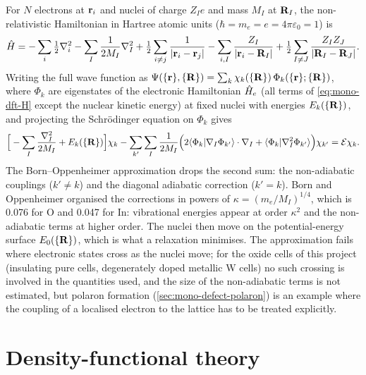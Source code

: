 For $N$ electrons at $\mathbf{r}_i$ and nuclei of charge $Z_I e$ and mass $M_I$ at $\mathbf{R}_I$, the non-relativistic Hamiltonian
in Hartree atomic units ($\hbar = m_e = e = 4\pi\varepsilon_0 = 1$) is
\begin{equation}
\hat{H} = -\sum_i \tfrac12\nabla_i^2 - \sum_I \frac{1}{2M_I}\nabla_I^2
 + \tfrac12\sum_{i\neq j}\frac{1}{|\mathbf{r}_i-\mathbf{r}_j|} - \sum_{i,I}\frac{Z_I}{|\mathbf{r}_i-\mathbf{R}_I|}
 + \tfrac12\sum_{I\neq J}\frac{Z_IZ_J}{|\mathbf{R}_I-\mathbf{R}_J|} .
\label{eq:mono-dft-H}
\end{equation}
Writing the full wave function as $\Psi(\{\mathbf{r}\},\{\mathbf{R}\}) = \sum_k \chi_k(\{\mathbf{R}\})\,\Phi_k(\{\mathbf{r}\};\{\mathbf{R}\})$, where
$\Phi_k$ are eigenstates of the electronic Hamiltonian $\hat{H}_e$ (all terms of \cref{eq:mono-dft-H} except the nuclear
kinetic energy) at fixed nuclei with energies $E_k(\{\mathbf{R}\})$, and projecting the Schr\"odinger equation on $\Phi_k$
gives
\begin{equation}
\Big[-\sum_I\frac{\nabla_I^2}{2M_I} + E_k(\{\mathbf{R}\})\Big]\chi_k
 - \sum_{k'}\sum_I \frac{1}{2M_I}\Big(2\langle\Phi_k|\nabla_I\Phi_{k'}\rangle\cdot\nabla_I
 + \langle\Phi_k|\nabla_I^2\Phi_{k'}\rangle\Big)\chi_{k'} = \mathcal{E}\chi_k .
\label{eq:mono-dft-bo-coupled}
\end{equation}
The Born--Oppenheimer approximation \citep{Born1927} drops the second sum: the non-adiabatic couplings ($k'\ne k$) and
the diagonal adiabatic correction ($k' = k$). Born and
Oppenheimer organised the corrections in powers of $\kappa = (m_e/M_I)^{1/4}$, which is 0.076 for O and 0.047 for In:
vibrational energies appear at order $\kappa^2$ and the non-adiabatic terms at higher order. The nuclei then move on the potential-energy surface $E_0(\{\mathbf{R}\})$, which is what a
relaxation minimises. The approximation fails where electronic states cross as the nuclei move; for the oxide cells of this project
(insulating pure cells, degenerately doped metallic W cells) no such crossing is involved in the quantities used, and
the size of the non-adiabatic terms is not estimated, but polaron formation
(\cref{sec:mono-defect-polaron}) is an example where the coupling of a localised electron to the lattice has to be
treated explicitly.

\section{Density-functional theory}
\label{sec:mono-dft-hk}

